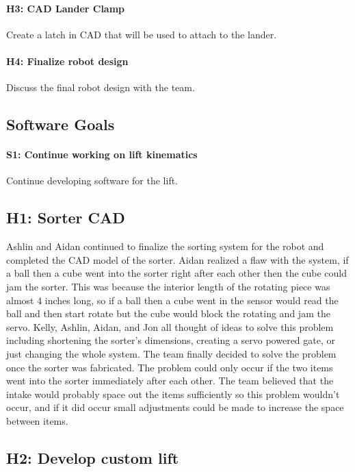 \documentclass{article}
\begin{document}
\paragraph{H3: CAD Lander Clamp}
 Create a latch in CAD that will be used to attach to the lander. 
\paragraph{H4: Finalize robot design}
 Discuss the final robot design with the team.
\subsection{Software Goals}
\paragraph{S1: Continue working on lift kinematics}
 Continue developing software for the lift.
\newpage
\subsection{H1: Sorter CAD}

Ashlin and Aidan continued to finalize the sorting system for the robot and completed the CAD model of the sorter. Aidan realized a flaw with the system, if a ball then a cube went into the sorter right after each other then the cube could jam the sorter. This was because the interior length of the rotating piece was almost 4 inches long, so if a ball then a cube went in the sensor would read the ball and then start rotate but the cube would block the rotating and jam the servo. Kelly, Ashlin, Aidan, and Jon all thought of ideas to solve this problem including shortening the sorter's dimensions, creating a servo powered gate, or just changing the whole system. The team finally decided to solve the problem once the sorter was fabricated. The problem could only occur if the two items went into the sorter immediately after each other. The team believed that the intake would probably space out the items sufficiently so this problem wouldn't occur, and if it did occur small adjustments could be made to increase the space between items.

\subsection{H2: Develop custom lift}
\end{document}
